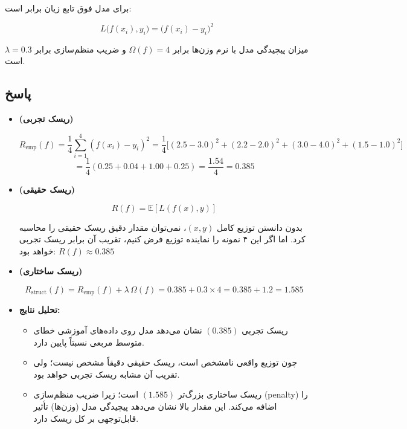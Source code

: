 \documentclass[12pt]{article}
\begin{document}
	برای مدل فوق تابع زیان برابر  است:
	
	\[
	L\bigl(f(x_i),y_i\bigr) = \bigl(f(x_i)-y_i\bigr)^2
	\]
	
	میزان پیچیدگی مدل با نرم وزن‌ها برابر \(\Omega(f)=4\) و ضریب منظم‌سازی برابر \(\lambda=0.3\) است.
	
	\subsection*{پاسخ}
	\begin{itemize}
		\item \textbf{ (ریسک تجربی)}
		
		\[
		R_{\text{emp}}(f)=\frac{1}{4}\sum_{i=1}^{4}(f(x_i)-y_i)^2
		=\frac{1}{4}\bigl[(2.5-3.0)^2+(2.2-2.0)^2+(3.0-4.0)^2+(1.5-1.0)^2\bigr]
		\]
		\[
		=\frac{1}{4}(0.25+0.04+1.00+0.25)=\frac{1.54}{4}=0.385
		\]
		
		\item \textbf{ (ریسک حقیقی)}
		
		\[
		R(f)=\mathbb{E}[L(f(x),y)]
		\]
		
		بدون دانستن توزیع کامل \((x,y)\)، نمی‌توان مقدار دقیق ریسک حقیقی را محاسبه کرد. اما اگر این ۴ نمونه را نماینده توزیع فرض کنیم، تقریب آن برابر ریسک تجربی خواهد بود: \(R(f)\approx 0.385\)
		
		\item \textbf{ (ریسک ساختاری)}
		
		\[
		R_{\text{struct}}(f)=R_{\text{emp}}(f)+\lambda\,\Omega(f)
		=0.385 + 0.3\times 4 =0.385 + 1.2 = 1.585
		\]
		
		\item \textbf{تحلیل نتایج:}
		\begin{itemize}
			\item ریسک تجربی \((0.385)\) نشان می‌دهد مدل روی داده‌های آموزشی خطای متوسط مربعی نسبتاً پایین دارد.
			\item چون توزیع واقعی نامشخص است، ریسک حقیقی دقیقاً مشخص نیست؛ ولی تقریب آن مشابه ریسک تجربی خواهد بود.
			\item ریسک ساختاری بزرگ‌تر \((1.585)\) است؛ زیرا ضریب منظم‌سازی (penalty) را اضافه می‌کند. این مقدار بالا نشان می‌دهد پیچیدگی مدل (وزن‌ها) تأثیر قابل‌توجهی بر کل ریسک دارد.
			
			
		\end{itemize}
	\end{itemize}
	
\end{document}
